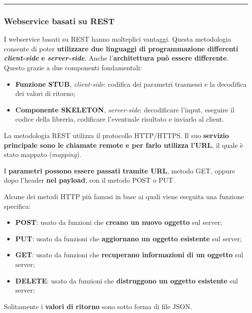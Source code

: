 \documentclass[a4paper]{article}
\newcommand{\longline}{\noindent\rule{\textwidth}{0.4pt}}
\begin{document}
	\longline
	
	\subsubsection{Webservice basati su REST}
	
	I webservice basati su REST hanno molteplici vantaggi. Questa metodologia consente di poter \textbf{utilizzare due linguaggi di programmazione differenti \emph{client-side} e \emph{server-side}}. Anche l'\textbf{architettura può essere differente}. Questo grazie a due componenti fondamentali:
	\begin{itemize}
		\item \textbf{Funzione STUB}, \emph{client-side}: codifica dei parametri trasmessi e la decodifica dei valori di ritorno;
		
		\item \textbf{Componente SKELETON}, \emph{server-side}: decodificare l'input, eseguire il codice della libreria, codificare l'eventuale risultato e inviarlo al client.
	\end{itemize}
	La metodologia REST utilizza il protocollo HTTP/HTTPS. Il suo \textbf{servizio principale sono le chiamate remote e per farlo utilizza l'URL}, il quale è stato mappato (\emph{mapping}).
	
	I \textbf{parametri possono essere passati tramite URL}, metodo GET, oppure dopo l'header \textbf{nel payload}, con il metodo POST o PUT.\newline
	
	\noindent
	Alcune dei metodi HTTP più famosi in base ai quali viene eseguita una funzione specifica:
	\begin{itemize}
		\item \textbf{POST}: usato da funzioni che \textbf{creano un nuovo oggetto} sul server;
		
		\item \textbf{PUT}: usato da funzioni che \textbf{aggiornano un oggetto esistente} sul server;
		
		\item \textbf{GET}: usato da funzioni che \textbf{recuperano informazioni di un oggetto} sul server;
		
		\item \textbf{DELETE}: usato da funzioni che \textbf{distruggono un oggetto esistente} sul server;
	\end{itemize}
	Solitamente i \textbf{valori di ritorno} sono sotto forma di file JSON.\newline
	
\end{document}
